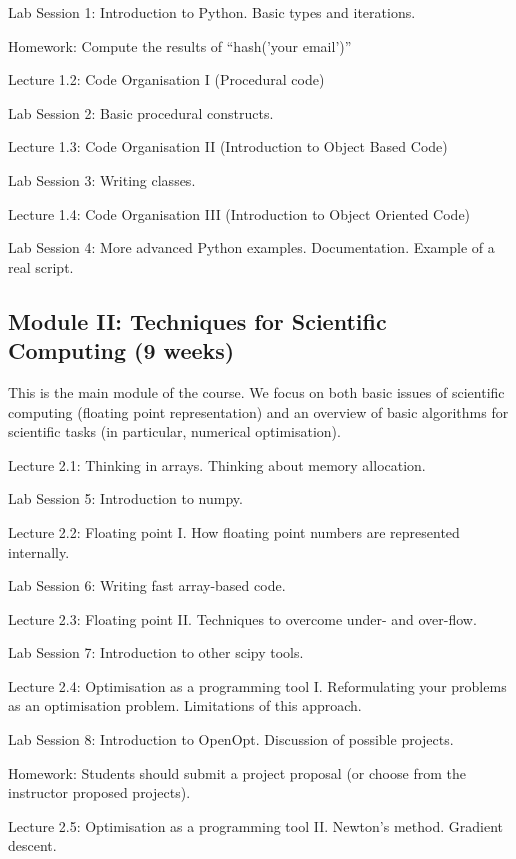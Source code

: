 \documentclass{article}
\begin{document}
Lab Session 1: Introduction to Python. Basic types and iterations.

Homework: Compute the results of ``hash('your email')'' %

Lecture 1.2: Code Organisation I (Procedural code)

Lab Session 2: Basic procedural constructs.

Lecture 1.3: Code Organisation II (Introduction to Object Based Code)

Lab Session 3: Writing classes.

Lecture 1.4: Code Organisation III (Introduction to Object Oriented Code)

Lab Session 4: More advanced Python examples. Documentation. Example of a real script.

\subsection{Module II: Techniques for Scientific Computing (9 weeks)}

This is the main module of the course. We focus on both basic issues of scientific computing (floating point representation) and an overview of basic algorithms for scientific tasks (in particular, numerical optimisation).

Lecture 2.1: Thinking in arrays. Thinking about memory allocation.

Lab Session 5: Introduction to numpy.

Lecture 2.2:  Floating point I. How floating point numbers are represented internally.

Lab Session 6: Writing fast array-based code.

Lecture 2.3: Floating point II. Techniques to overcome under- and over-flow.

Lab Session 7: Introduction to other scipy tools.

Lecture 2.4: Optimisation as a programming tool I. Reformulating your problems as an optimisation problem. Limitations of this approach.

Lab Session 8: Introduction to OpenOpt. Discussion of possible projects.

Homework: Students should submit a project proposal (or choose from the instructor proposed projects).

Lecture 2.5: Optimisation as a programming tool II. Newton's method. Gradient descent.
\end{document}
